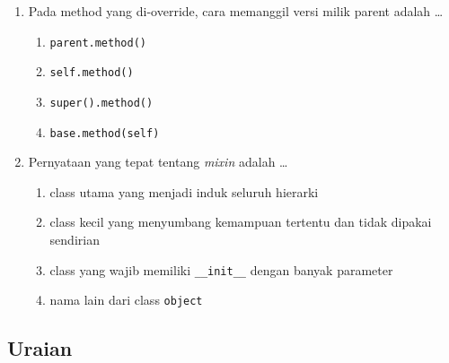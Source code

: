 \begin{enumerate}
\begin{kode}[Soal 8]
class D(C, B):
    def f(self):
        return "D" + super().f()

print(D().f())
\end{kode}
  Keluaran kode tersebut adalah \ldots
  \begin{enumerate}[label=\alph*.,itemsep=0pt]
    \item \texttt{DBCA}
    \item \texttt{DCBA}
    \item \texttt{DCA}
    \item \texttt{DCABA}
  \end{enumerate}

  \item Pada method yang di-override, cara memanggil versi milik parent adalah \ldots
  \begin{enumerate}[label=\alph*.,itemsep=0pt]
    \item \texttt{parent.method()}
    \item \texttt{self.method()}
    \item \texttt{super().method()}
    \item \texttt{base.method(self)}
  \end{enumerate}

  \item Pernyataan yang tepat tentang \emph{mixin} adalah \ldots
  \begin{enumerate}[label=\alph*.,itemsep=0pt]
    \item class utama yang menjadi induk seluruh hierarki
    \item class kecil yang menyumbang kemampuan tertentu dan tidak dipakai sendirian
    \item class yang wajib memiliki \texttt{\_\_init\_\_} dengan banyak parameter
    \item nama lain dari class \texttt{object}
  \end{enumerate}
\end{enumerate}

\subsection{Uraian}

